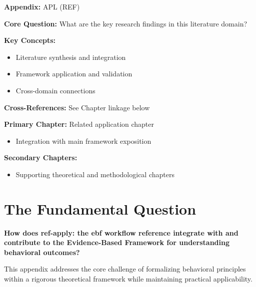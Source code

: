 \begin{tcolorbox}[colback=blue!5!white, colframe=blue!75!black,
    title=Quick Reference: Appendix UNMAPPED_APL]
\textbf{Appendix:} APL (REF)

\textbf{Core Question:} What are the key research findings in this literature domain?

\textbf{Key Concepts:}
\begin{itemize}[nosep]
\item Literature synthesis and integration
\item Framework application and validation
\item Cross-domain connections
\end{itemize}

\textbf{Cross-References:} See Chapter linkage below
\end{tcolorbox}


\begin{tcolorbox}[colback=purple!5!white, colframe=purple!75!black,
    title=Chapter Linkage]

\textbf{Primary Chapter:} Related application chapter
\begin{itemize}[nosep]
\item Integration with main framework exposition
\end{itemize}

\textbf{Secondary Chapters:}
\begin{itemize}[nosep]
\item Supporting theoretical and methodological chapters
\end{itemize}

\end{tcolorbox}

\section{The Fundamental Question}
\label{sec:apl-fundamental}

\begin{tcolorbox}[
    colback=red!5!white,
    colframe=red!75!black,
    title={\textbf{Fundamental Question}}
]
\textbf{How does ref-apply: the ebf workflow reference integrate with and contribute to the
Evidence-Based Framework for understanding behavioral outcomes?}

This appendix addresses the core challenge of formalizing behavioral principles
within a rigorous theoretical framework while maintaining practical applicability.
\end{tcolorbox}


